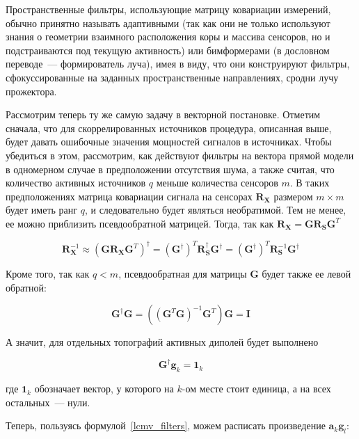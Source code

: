 Пространственные фильтры, использующие матрицу ковариации измерений, обычно
принятно называть адаптивными (так как они не только используют знания о
геометрии взаимного расположения коры и массива сенсоров, но и подстраиваются
под текущую активность) или бимформерами (в дословном переводе~---
формирователь луча), имея в виду, что они конструируют фильтры,
сфокуссированные на заданных пространственные направлениях, сродни лучу
прожектора.

Рассмотрим теперь ту же самую задачу в векторной постановке.  Отметим сначала,
что для скоррелированных источников процедура, описанная выше, будет давать
ошибочные значения мощностей сигналов в источниках.  Чтобы убедиться в этом,
рассмотрим, как действуют фильтры на вектора прямой модели в одномерном случае
в предположении отсутствия шума, а также считая, что количество активных
источников $q$ меньше количества сенсоров $m$.  В таких предположениях матрица
ковариации сигнала на сенсорах $\mathbf{R}_{\mathbf{X}}$ размером $m\times m$
будет иметь ранг $q$, и следовательно будет являться необратимой.  Тем не
менее, ее можно приблизить псевдообратной матрицей.  Тогда, так как
$\mathbf{R}_\mathbf{X} = \mathbf{G} \mathbf{R}_\mathbf{S} \mathbf{G}^T$

\begin{equation}
    \mathbf{R}_\mathbf{X}^{-1} \approx {(\mathbf{G} \mathbf{R}_\mathbf{X} \mathbf{G}^T)}^\dagger =
    {(\mathbf{G}^\dagger)}^T \mathbf{R}_\mathbf{S}^\dagger \mathbf{G}^\dagger = 
    {(\mathbf{G}^\dagger)}^T \mathbf{R}_\mathbf{S}^{-1} \mathbf{G}^\dagger
\end{equation}

Кроме того, так как $q < m$, псевдообратная для матрицы $\mathbf{G}$ будет также ее левой обратной:

\begin{equation}
    \mathbf{G}^\dagger \mathbf{G} = ({(\mathbf{G}^T \mathbf{G})}^{-1} \mathbf{G}^T) \mathbf{G} = \mathbf{I}
\end{equation}

А значит, для отдельных топографий активных диполей будет выполнено

\begin{equation}
    \mathbf{G}^\dagger \mathbf{g}_k = \mathbf{1}_k
\end{equation}

где $\mathbf{1}_k$ обозначает вектор, у которого на $k$-ом месте стоит единица,
а на всех остальных~--- нули.

Теперь, пользуясь формулой~\ref{lcmv_filters}, можем расписать произведение
$\mathbf{a}_k \mathbf{g}_l$:

